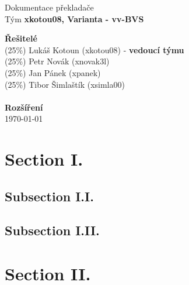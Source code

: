 \documentclass[a4pater]{article}
\begin{document}
\begin{titlepage}
    \begin{center}
        {\Huge Dokumentace překladače} \\[0.4em]
        {\Large Tým \textbf{xkotou08, Varianta - vv-BVS}}
    \end{center}
    {\Large \textbf{Řešitelé}} \\[0.4em]
        {\Large
        \hspace*{0.5cm} (25\%) Lukáš Kotoun (xkotou08) - \textbf{vedoucí týmu}\\
        \hspace*{0.5cm} (25\%) Petr Novák (xnovak3l) \\
        \hspace*{0.5cm} (25\%) Jan Pánek (xpanek) \\
        \hspace*{0.5cm} (25\%) Tibor Šimlaštík (xsimla00) \\
        }
     \\
    {\Large \textbf{Rozšíření}} \\[0.4em]


    {\Large \today}
\end{titlepage}


\tableofcontents
\newpage


\section{Section I.}
\subsection{Subsection I.I.}
\subsection{Subsection I.II.}
\section{Section II.}
\end{document}
